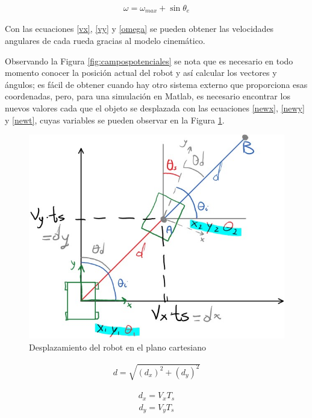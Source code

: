 \documentclass[conference]{IEEEtran}
\begin{document}
\begin{gather}\label{omega}
  \omega = \omega_{max}+\sin \theta_{e}
\end{gather}

Con las ecuaciones \ref{vx}, \ref{vy} y \ref{omega} se pueden obtener las velocidades
angulares de cada rueda gracias al modelo cinemático.

Observando la Figura \ref{fig:campospotenciales} se nota que es necesario en todo
momento conocer la posición actual del robot y así calcular los vectores y ángulos;
es fácil de obtener cuando hay otro sistema externo que proporciona esas coordenadas, pero,
para una simulación en Matlab, es necesario encontrar los nuevos valores cada que el objeto
se desplazada con las ecuaciones \ref{newx}, \ref{newy} y \ref{newt}, cuyas variables
se pueden observar en la Figura \ref{fig:newpositions}.

\begin{figure}
  \includegraphics[width=\linewidth]{figures/new_positions.jpg}
  \caption{Desplazamiento del robot en el plano cartesiano}
  \label{fig:newpositions}
\end{figure}

\begin{gather}
  d = \sqrt{(d_{x})^2+(d_{y})^2}
\end{gather}

\begin{gather}
  d_{x} = V_{x} T_{s}
\end{gather}
\begin{gather}
  d_{y} = V_{y} T_{s}
\end{gather}
\end{document}
